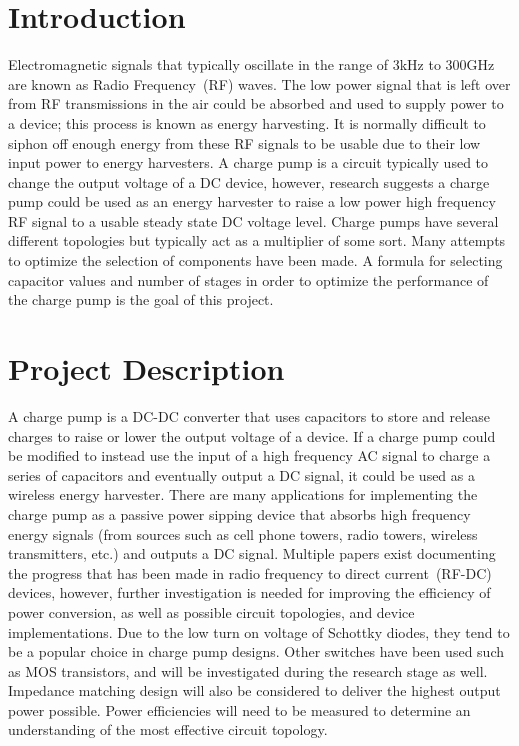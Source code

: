 \documentclass[12pt]{article}
\begin{document}
	\newpage
	\tableofcontents
	\newpage
	
	
	\section{Introduction}
	Electromagnetic signals that typically oscillate in the range of 3kHz to 300GHz are known as Radio Frequency~(RF) waves. The low power signal that is left over from RF transmissions in the air could be absorbed and used to supply power to a device; this process is known as energy harvesting. It is normally difficult to siphon off enough energy from these RF signals to be usable due to their low input power to energy harvesters. A charge pump is a circuit typically used to change the output voltage of a DC device, however, research suggests a charge pump could be used as an energy harvester to raise a low power high frequency RF signal to a usable steady state DC voltage level. Charge pumps have several different topologies but typically act as a multiplier of some sort. Many attempts to optimize the selection of components have been made. A formula for selecting capacitor values and number of stages in order to optimize the performance of the charge pump is the goal of this project.

	\section{Project Description}
	A charge pump is a DC-DC converter that uses capacitors to store and release charges to raise or lower the output voltage of a device. If a charge pump could be modified to instead use the input of a high frequency AC signal to charge a series of capacitors and eventually output a DC signal, it could be used as a wireless energy harvester. There are many applications for implementing the charge pump as a passive power sipping device that absorbs high frequency energy signals (from sources such as cell phone towers, radio towers, wireless transmitters, etc.) and outputs a DC signal. Multiple papers exist documenting the progress that has been made in radio frequency to direct current~(RF-DC) devices, however, further investigation is needed for improving the efficiency of power conversion, as well as possible circuit topologies, and device implementations. Due to the low turn on voltage of Schottky diodes, they tend to be a popular choice in charge pump designs. Other switches have been used such as MOS transistors, and will be investigated during the research stage as well. Impedance matching design will also be considered to deliver the highest output power possible. Power efficiencies will need to be measured to determine an understanding of the most effective circuit topology.
	
\end{document}
